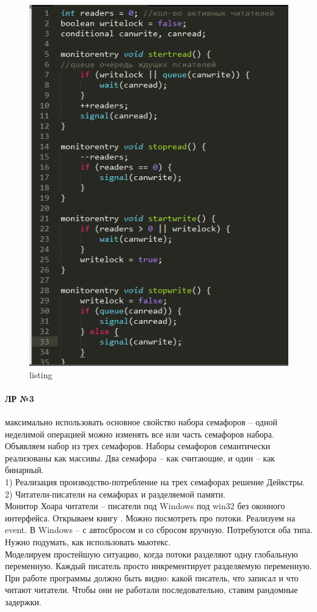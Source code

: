 \begin{figure}[H]
    \centering
    \includegraphics[width=\textwidth]{listing/1.png}
    \caption{listing}
\end{figure}

\paragraph{ЛР №3}  максимально использовать основное свойство набора семафоров – одной неделимой операцией можно изменять все или часть семафоров набора.  Объявляем набор из трех семафоров. Наборы семафоров семантически реализованы как массивы. Два семафора – как считающие, и один – как бинарный.\\ 
1) Реализация производство-потребление на трех семафорах решение Дейкстры.\\
2) Читатели-писатели на семафорах и разделяемой памяти.\\
Монитор Хоара читатели – писатели под Windows под win32 без оконного интерфейса. Открываем книгу \cite{Rih_Win_prof}. Можно посмотреть про потоки. Реализуем на event. В Windows – с автосбросом и со сбросом вручную. Потребуются оба типа. Нужно подумать, как использовать мьютекс.\\ 
Моделируем простейшую ситуацию, когда потоки разделяют одну глобальную переменную. Каждый писатель просто инкрементирует разделяемую переменную. При работе программы должно быть видно: какой писатель,  что записал и что читают читатели. Чтобы они не работали последовательно, ставим рандомные задержки.


